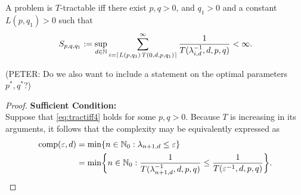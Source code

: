 \documentclass[11pt,a4paper]{article}
\newcommand{\peter}[1]{\begingroup\color{purple}#1\endgroup}
\begin{document}
\begin{theorem}\label{thm_main_tract2}
A problem is $T$-tractable iff there exist $p,q>0$, and $q_1>0$ and a constant $L(p,q_1) > 0$ such that
\begin{equation} \label{eq:tractiff4}
     S_{p,q,q_1}:=\sup_{d \in \mathbb{N}}
     \sum_{i = \lceil L(p,q_1)\, T(0,d,p,q_1) \rceil}^\infty \frac{1}{T(\lambda^{-1}_{i,d},d,p,q)}< \infty.
\end{equation}
\end{theorem}

\peter{(PETER: Do we also want to include a statement on the optimal parameters $p^*,q^*$?)}

\begin{proof}
    \textbf{Sufficient Condition:}\\ Suppose that \eqref{eq:tractiff4} holds for some $p,q>0$.
Because $T$ is increasing in its arguments, it follows that the complexity may be equivalently expressed as
\begin{align*}
    \operatorname{comp}(\varepsilon, d) &= \min \{n \in \mathbb{N}_{0} : \lambda_{n+1, d} \le \varepsilon\} \\
    &= \min \biggl\{n \in \mathbb{N}_{0} : \frac{1}{T(\lambda_{n+1, d}^{-1},d,p,q)} \le \frac{1}{T(\varepsilon^{-1},d,p,q)} \biggr\}.
\end{align*}


\end{proof}
\end{document}

